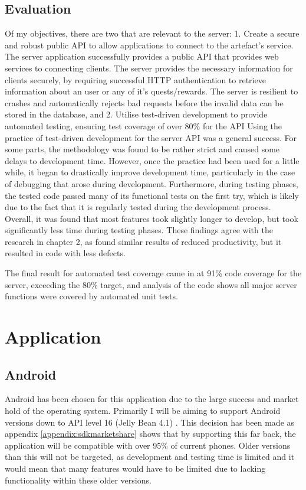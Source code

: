 \subsection{Evaluation}
Of my objectives, there are two that are relevant to the server:
1. Create a secure and robust public API to allow applications to connect to the artefact's service.
The server application successfully provides a public API that provides web services to connecting clients.
The server provides the necessary information for clients securely, by requiring successful HTTP authentication to retrieve information about an user or any of it's quests/rewards.
The server is resilient to crashes and automatically rejects bad requests before the invalid data can be stored in the database, and
2. Utilise test-driven development to provide automated testing, ensuring test coverage of over 80\% for the API
Using the practice of test-driven development for the server API was a general success. 
For some parts, the methodology was found to be rather strict and caused some delays to development time.
However, once the practice had been used for a little while, it began to drastically improve development time, particularly in the case of debugging that arose during development.
Furthermore, during testing phases, the tested code passed many of its functional tests on the first try, which is likely due to the fact that it is regularly tested during the development process.
Overall, it was found that most features took slightly longer to develop, but took significantly less time during testing phases.
These findings agree with the research in chapter 2, as \cite{IBMTDD} found similar results of reduced productivity, but it resulted in code with less defects.

The final result for automated test coverage came in at 91\% code coverage for the server, exceeding the 80\% target, and analysis of the code shows all major server functions were covered by automated unit tests.

\section{Application}
\subsection{Android}
Android has been chosen for this application due to the large success and market hold of the operating system.
Primarily I will be aiming to support Android versions down to API level 16 (Jelly Bean 4.1) \footnotemark[1].
This decision has been made as appendix \ref{appendix:sdkmarketshare} shows that by supporting this far back, the application will be compatible with over 95\% of current phones. 
Older versions than this will not be targeted, as development and testing time is limited and it would mean that many features would have to be limited due to lacking functionality within these older versions.

